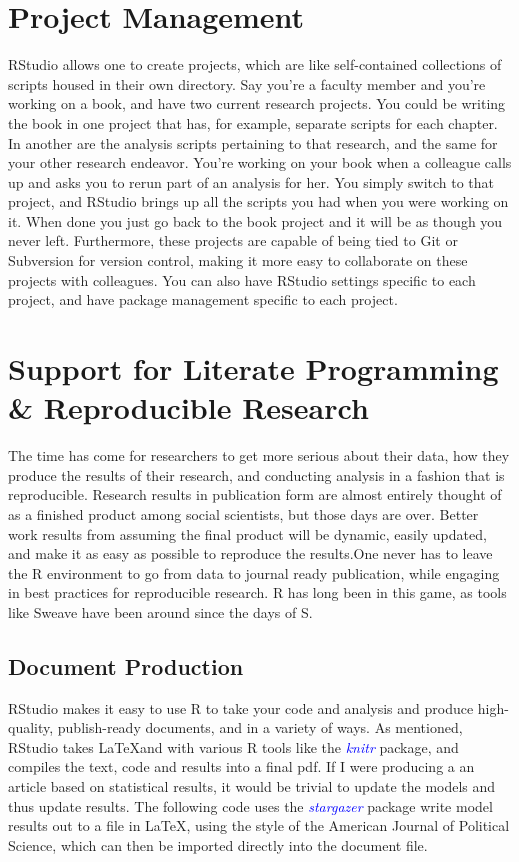 \documentclass[english,nohyper,titlepage]{tufte-handout}\usepackage[]{graphicx}\usepackage[]{color}
\begin{document}
\section{Project Management}
RStudio allows one to create projects, which are like self-contained collections of scripts housed in their own directory. Say you're a faculty member and you're working on a book, and have two current research projects.  You could be writing the book in one project that has, for example, separate scripts for each chapter. In another are the analysis scripts pertaining to that research, and the same for your other research endeavor.   You're working on your book when a colleague calls up and asks you to rerun part of an analysis for her.  You simply switch to that project, and RStudio brings up all the scripts you had when you were working on it.  When done you just go back to the book project and it will be as though you never left.  Furthermore, these projects are capable of being tied to Git or Subversion for version control, making it more easy to collaborate on these projects with colleagues.  You can also have RStudio settings specific to each project, and have package management specific to each project.


\section{Support for Literate Programming \& Reproducible Research}
The time has come for researchers to get more serious about their data, how they produce the results of their research, and conducting analysis in a fashion that is reproducible.  Research results in publication form are almost entirely thought of as a finished product among social scientists, but those days are over.  Better work results from assuming the final product will be dynamic, easily updated, and make it as easy as possible to reproduce the results.One never has to leave the R environment to go from data to journal ready publication, while engaging in best practices for reproducible research. R has long been in this game, as tools like Sweave have been around since the days of S. 

\subsection{Document Production}
RStudio makes it easy to use R to take your code and analysis and produce high-quality, publish-ready documents, and in a variety of ways.  As mentioned, RStudio takes \LaTeX and with various R tools like the \emph{\textcolor{blue}{knitr}} package, and compiles the text, code and results into a final pdf.  If I were producing a an article based on statistical results, it would be trivial to update the models and thus update results.  The following code uses the \emph{\textcolor{blue}{stargazer}} package write model results out to a file in \LaTeX, using the style of the American Journal of Political Science, which can then be imported directly into the document file.
\end{document}
